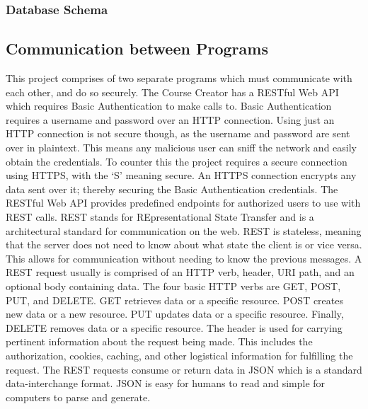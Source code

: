 \subsubsection{Database Schema}

\subsection{Communication between Programs}
This project comprises of two separate programs which must communicate with each other, and do so securely. The Course Creator has a RESTful Web API which requires Basic Authentication to make calls to.  Basic Authentication requires a username and password over an HTTP connection. Using just an HTTP connection is not secure though, as the username and password are sent over in plaintext. This means any malicious user can sniff the network and easily obtain the credentials. To counter this the project requires a secure connection using HTTPS, with the `S' meaning secure. An HTTPS connection encrypts any data sent over it; thereby securing the Basic Authentication credentials. The RESTful Web API provides predefined endpoints for authorized users to use with REST calls. REST stands for REpresentational State Transfer and is a architectural standard for communication on the web. REST is stateless, meaning that the server does not need to know about what state the client is or vice versa. This allows for communication without needing to know the previous messages. A REST request usually is comprised of an HTTP verb, header, URI path, and an optional body containing data. The four basic HTTP verbs are GET, POST, PUT, and DELETE. GET retrieves data or a specific resource. POST creates new data or a new resource. PUT updates data or a specific resource. Finally, DELETE removes data or a specific resource. The header is used for carrying pertinent information about the request being made. This includes the authorization, cookies, caching, and other logistical information for fulfilling the request. The REST requests consume or return data in JSON which is a standard data-interchange format. JSON is easy for humans to read and simple for computers to parse and generate.


